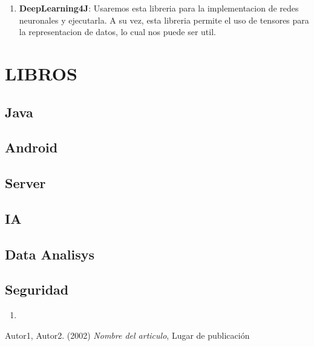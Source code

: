 \documentclass{article}
\theoremstyle{definition}
\begin{document}
\begin{enumerate}
    \item \textbf{DeepLearning4J}: Usaremos esta libreria para la implementacion de redes neuronales y ejecutarla. A su vez, esta libreria permite el uso de tensores para la representacion de datos, lo cual nos puede ser util.
\end{enumerate}

\section{LIBROS}

\subsection{Java}

\subsection{Android}

\subsection{Server}

\subsection{IA}

\subsection{Data Analisys}

\subsection{Seguridad}


\begin{enumerate}
    \item 
\end{enumerate}

\begin{thebibliography}{9}
Autor1, Autor2. (2002) \textit{Nombre del articulo}, Lugar de publicación

\end{thebibliography}
\end{document}
